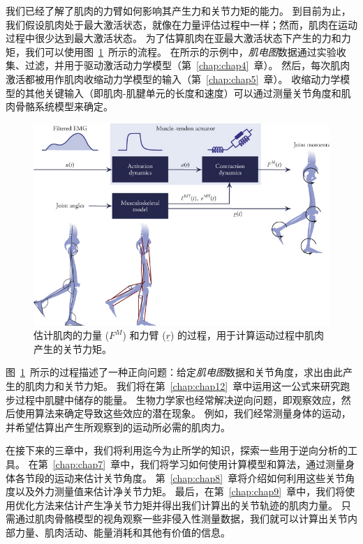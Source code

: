 我们已经了解了肌肉的力臂如何影响其产生力和关节力矩的能力。
到目前为止，我们假设肌肉处于最大激活状态，就像在力量评估过程中一样；然而，肌肉在运动过程中很少达到最大激活状态。
为了估算肌肉在亚最大激活状态下产生的力和力矩，我们可以使用图~\ref{fig:6_17}~所示的流程。
在所示的示例中，\textit{肌电图}数据通过实验收集、过滤，并用于驱动激活动力学模型（第~\ref{chap:chap4}~章）。
然后，每次肌肉激活都被用作肌肉收缩动力学模型的输入（第~\ref{chap:chap5}~章）。
收缩动力学模型的其他关键输入（即肌肉-肌腱单元的长度和速度）可以通过测量关节角度和肌肉骨骼系统模型来确定。


\begin{figure}[!htb]
	\centering
	\includegraphics[width=1.0\linewidth]{chap6/6_17}
	\caption{估计肌肉的力量 ($F^M$) 和力臂 ($\underline{r}$) 的过程，用于计算运动过程中肌肉产生的关节力矩。 \label{fig:6_17}}
\end{figure}


图~\ref{fig:6_17}~所示的过程描述了一种正向问题：给定\textit{肌电图}数据和关节角度，求出由此产生的肌肉力和关节力矩。
我们将在第~\ref{chap:chap12}~章中运用这一公式来研究跑步过程中肌腱中储存的能量。
生物力学家也经常解决逆向问题，即观察效应，然后使用算法来确定导致这些效应的潜在现象。
例如，我们经常测量身体的运动，并希望估算出产生所观察到的运动所必需的肌肉力。


在接下来的三章中，我们将利用迄今为止所学的知识，探索一些用于逆向分析的工具。
在第~\ref{chap:chap7}~章中，我们将学习如何使用计算模型和算法，通过测量身体各节段的运动来估计关节角度。
第~\ref{chap:chap8}~章将介绍如何利用这些关节角度以及外力测量值来估计净关节力矩。
最后，在第~\ref{chap:chap9}~章中，我们将使用优化方法来估计产生净关节力矩并得出我们计算出的关节轨迹的肌肉力量。
只需通过肌肉骨骼模型的视角观察一些非侵入性测量数据，我们就可以计算出关节内部力量、肌肉活动、能量消耗和其他有价值的信息。



